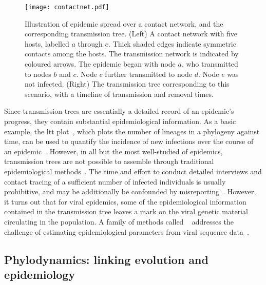 \begin{figure}
    \centering
    \texttt{[image: contactnet.pdf]}
    \caption[Illustration of a contact network and transmission tree]{
      Illustration of epidemic spread over a contact network, and the
      corresponding transmission tree. (Left) A contact network with five
      hosts, labelled $a$ through $e$. Thick shaded edges indicate symmetric
      contacts among the hosts. The transmission network is indicated by
      coloured arrows. The epidemic began with node $a$, who transmitted to
      nodes $b$ and $c$. Node $c$ further transmitted to node $d$. Node $e$ was
      not infected. (Right) The transmission tree corresponding to this
      scenario, with a timeline of transmission and removal times.
    }
    \label{fig:contactnet}
\end{figure}

Since transmission trees are essentially a detailed record of an epidemic's
progress, they contain substantial epidemiological information. As a basic
example, the \gls{ltt} plot~\autocite{nee1992tempo}, which plots the number of
lineages in a phylogeny against time, can be used to quantify the incidence of
new infections over the course of an epidemic~\autocite{holmes1995revealing}.
However, in all but the most well-studied of epidemics, transmission trees are
not possible to assemble through traditional epidemiological
methods~\autocite{welch2011statistical}. The time and effort to conduct
detailed interviews and contact tracing of a sufficient number of infected
individuals is usually prohibitive, and may be additionally be confounded by
misreporting~\autocite{eames2015six}. However, it turns out that for viral
epidemics, some of the epidemiological information contained in the
transmission tree leaves a mark on the viral genetic material circulating in
the population. A family of methods called
~\autocite{grenfell2004unifying} addresses the challenge of
estimating epidemiological parameters from viral sequence
data~\autocite{volz2013viral}.

\subsection{Phylodynamics: linking evolution and epidemiology}


